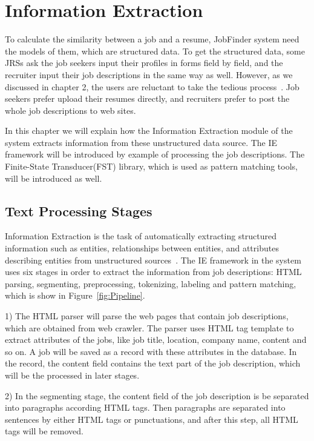 \chapter{Information Extraction}

To calculate the similarity between a job and a resume, JobFinder system need the models of them, which are  structured data. To get the structured data, some JRSs ask the job seekers input their profiles in forms field by field, and the recruiter input their job descriptions in the same way as well. However, as we discussed in chapter 2, the users are reluctant to take the tedious process~\cite{singh2010prospect}. Job seekers prefer upload their resumes directly, and recruiters prefer to post the whole job descriptions to web sites. 

In this chapter we will explain how the Information Extraction module of the system extracts information from these unstructured data source. The IE framework will be introduced by example of processing the job descriptions. The Finite-State Transducer(FST) library, which is used as pattern matching tools, will be introduced as well.  

\section{Text Processing Stages}

Information Extraction is the task of automatically extracting structured information such as entities, relationships between entities, and attributes describing entities from unstructured sources~\cite{sarawagi2008information}. The IE framework in the system uses six stages in order to extract the information from job descriptions: HTML parsing, segmenting, preprocessing, tokenizing, labeling and pattern matching, which is show in Figure~\ref{fig:Pipeline}.

1) The HTML parser will parse the web pages that contain job descriptions, which are obtained from web crawler. The parser uses HTML tag template to extract attributes of the jobs, like job title, location, company name, content and so on. A job will be saved as a record with these attributes in the database. In the record, the content field contains the text part of the job description, which will be the processed in later stages.

2) In the segmenting stage, the content field of the job description is be separated into paragraphs according HTML tags. Then paragraphs are separated into sentences by either HTML tags or punctuations, and after this step, all HTML tags will be removed.

